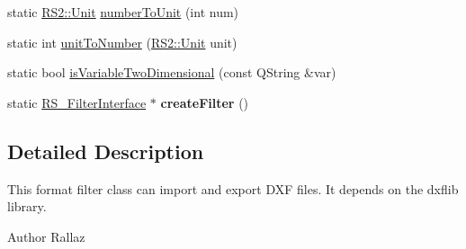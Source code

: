 \begin{DoxyCompactItemize}
\item 
static \hyperlink{classRS2_ad859751df6978737e4f35ec111ff9828}{R\-S2\-::\-Unit} \hyperlink{classRS__FilterDXFRW_a949fd6e8577a2ff31088d81ef3ba693a}{number\-To\-Unit} (int num)
\item 
static int \hyperlink{classRS__FilterDXFRW_a1d7dab62945e43f488276df4b38b7439}{unit\-To\-Number} (\hyperlink{classRS2_ad859751df6978737e4f35ec111ff9828}{R\-S2\-::\-Unit} unit)
\item 
static bool \hyperlink{classRS__FilterDXFRW_a6923381f638475d349406ade1bab9858}{is\-Variable\-Two\-Dimensional} (const Q\-String \&var)
\item 
\hypertarget{classRS__FilterDXFRW_aed47408bc5d92ece5e6175e4f1a179cc}{static \hyperlink{classRS__FilterInterface}{R\-S\-\_\-\-Filter\-Interface} $\ast$ {\bfseries create\-Filter} ()}\label{classRS__FilterDXFRW_aed47408bc5d92ece5e6175e4f1a179cc}

\end{DoxyCompactItemize}


\subsection{Detailed Description}
This format filter class can import and export D\-X\-F files. It depends on the dxflib library.

\begin{DoxyAuthor}{Author}
Rallaz 
\end{DoxyAuthor}


